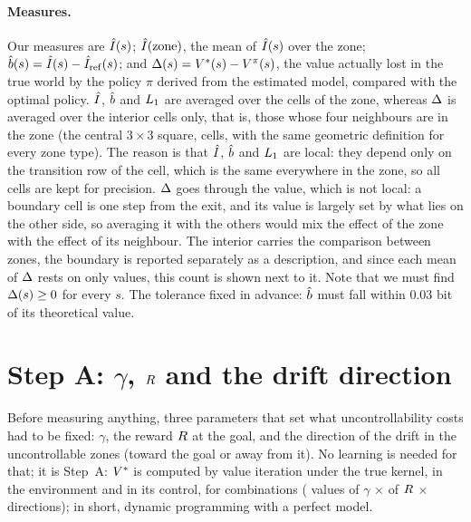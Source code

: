 \documentclass[10pt]{article}
\begin{document}
\paragraph{Measures.}
Our measures are $\hat{I}(s)$; $\hat{I}(\text{zone})$, the mean of $\hat{I}(s)$ over the zone; $\hat{b}(s) = \hat{I}(s) - \hat{I}_{\mathrm{ref}}(s)$;
and $\Delta(s) = V^{*}(s) - V^{\pi}(s)$, the value actually lost in the true world by the policy $\pi$ derived from the
estimated model, compared with the optimal policy.
$\hat{I}$, $\hat{b}$ and $L_{1}$ are averaged over the \eOneZoneCells{} cells of the zone, whereas $\Delta$ is averaged
over the interior cells only, that is, those whose four neighbours are in the zone (the central $3 \times 3$ square, %
\eOneInteriorCells{} cells, with the same geometric definition for every zone type).
The reason is that $\hat{I}$, $\hat{b}$ and $L_{1}$ are local: they depend only on the transition row of the cell, which is the
same everywhere in the zone, so all cells are kept for precision. $\Delta$ goes through the value, which is not local:
a boundary cell is one step from the exit, and its value is largely set by what lies on the other side, so averaging it
with the others would mix the effect of the zone with the effect of its neighbour. The interior carries the comparison
between zones, the boundary is reported separately as a description, and since each mean of $\Delta$ rests on only
\eOneInteriorCells{} values, this count is shown next to it.
Note that we must find $\Delta(s) \geq 0$ for every $s$. %
The tolerance fixed in advance: $\hat{b}$ must fall within 0.03 bit of its theoretical value. %

\section{Step A: $\gamma$, $R$ and the drift direction}
\label{sec:stepA}

Before measuring anything, three parameters that set what uncontrollability costs had to be fixed: $\gamma$, the reward
$R$ at the goal, and the direction of the drift in the uncontrollable zones (toward the goal or away from it).
No learning is needed for that; it is Step~A: $V^{*}$ is computed by value iteration under the true kernel, in the
environment and in its control, for \eOneCalibCombos{} combinations (\eOneCalibGammas{} values of $\gamma$
$\times$ \eOneCalibRewards{} of $R$ $\times$ \eOneCalibDirections{} directions); in short, dynamic programming with
a perfect model.
\end{document}
